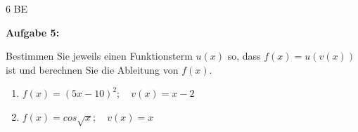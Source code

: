 \documentclass[a4paper,12pt]{article}
\newcommand{\Aufgabe}[1]{
  {
  \vspace*{0.5cm}
  \textsf{\textbf{Aufgabe #1}}
  \vspace*{0.2cm}
  
  }
}
\begin{document}
\begin{figure}[H]
  \centering

\end{figure}

\begin{flushright}6 BE \end{flushright}
\newpage





\Aufgabe {5:} 

Bestimmen Sie jeweils einen Funktionsterm $u(x)$ so, dass $f(x)=u(v(x))$ ist und berechnen Sie die Ableitung von $f(x)$.


\begin{enumerate}[label={\alph*)}]
  \item $f(x)=(5x-10)^2; \quad v(x)=x-2$
  \item $f(x)=cos\sqrt{x}; \quad v(x)=x$
\end{enumerate}
\end{document}
